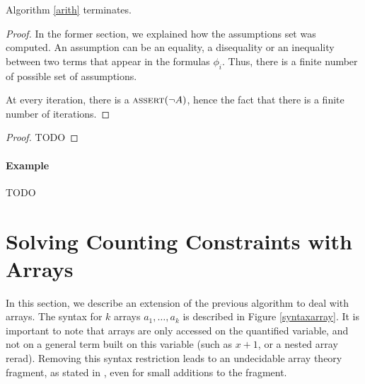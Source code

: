 \documentclass[]{article}
\begin{document}
\vspace{3mm}

\begin{lemma}[Termination]

Algorithm \ref{arith} terminates.

\label{termination}

\end{lemma}

\begin{proof}
In the former section, we explained how the assumptions set was computed. An
assumption can be an equality, a disequality or an inequality between two terms
that appear in the formulas $\phi_i$. Thus, there is a finite number of possible
set of assumptions.

At every iteration, there is a $\text{\textsc{assert}}(\lnot A)$, hence the fact that there is
a finite number of iterations.
\end{proof}

\vspace{3mm}

\begin{lemma}[Correctness]

\label{correctness}

\end{lemma}

\begin{proof}TODO\end{proof}

\paragraph{Example}\label{example}

TODO

\section{Solving Counting Constraints with
Arrays}\label{solving-counting-constraints-with-arrays}

In this section, we describe an extension of the previous algorithm to
deal with arrays. The syntax for $k$ arrays $a_1, \ldots, a_k$ is
described in Figure \ref{syntaxarray}. It is important to note that
arrays are only accessed on the quantified variable, and not on a
general term built on this variable (such as $x + 1$, or a nested
array rerad). Removing this syntax restriction leads to an undecidable
array theory fragment, as stated in
\cite{bradley2006s}, even for small additions to the
fragment.
\end{document}
